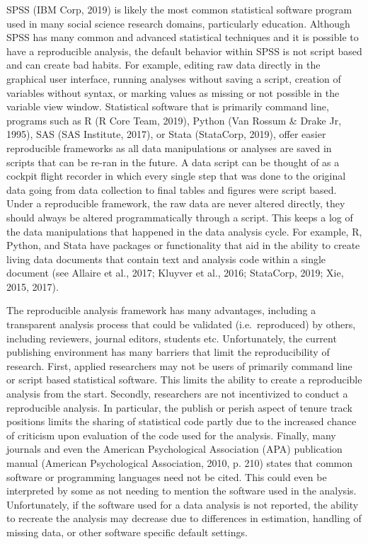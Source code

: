 \documentclass[
  english,
  ,man]{apa7}
\begin{document}
SPSS (IBM Corp, 2019) is likely the most common statistical software program used in many social science research domains, particularly education. Although SPSS has many common and advanced statistical techniques and it is possible to have a reproducible analysis, the default behavior within SPSS is not script based and can create bad habits. For example, editing raw data directly in the graphical user interface, running analyses without saving a script, creation of variables without syntax, or marking values as missing or not possible in the variable view window. Statistical software that is primarily command line, programs such as R (R Core Team, 2019), Python (Van Rossum \& Drake Jr, 1995), SAS (SAS Institute, 2017), or Stata (StataCorp, 2019), offer easier reproducible frameworks as all data manipulations or analyses are saved in scripts that can be re-ran in the future. A data script can be thought of as a cockpit flight recorder in which every single step that was done to the original data going from data collection to final tables and figures were script based. Under a reproducible framework, the raw data are never altered directly, they should always be altered programmatically through a script. This keeps a log of the data manipulations that happened in the data analysis cycle. For example, R, Python, and Stata have packages or functionality that aid in the ability to create living data documents that contain text and analysis code within a single document (see Allaire et al., 2017; Kluyver et al., 2016; StataCorp, 2019; Xie, 2015, 2017).

The reproducible analysis framework has many advantages, including a transparent analysis process that could be validated (i.e.~reproduced) by others, including reviewers, journal editors, students etc. Unfortunately, the current publishing environment has many barriers that limit the reproducibility of research. First, applied researchers may not be users of primarily command line or script based statistical software. This limits the ability to create a reproducible analysis from the start. Secondly, researchers are not incentivized to conduct a reproducible analysis. In particular, the publish or perish aspect of tenure track positions limits the sharing of statistical code partly due to the increased chance of criticism upon evaluation of the code used for the analysis. Finally, many journals and even the American Psychological Association (APA) publication manual (American Psychological Association, 2010, p. 210) states that common software or programming languages need not be cited. This could even be interpreted by some as not needing to mention the software used in the analysis. Unfortunately, if the software used for a data analysis is not reported, the ability to recreate the analysis may decrease due to differences in estimation, handling of missing data, or other software specific default settings.
\end{document}
